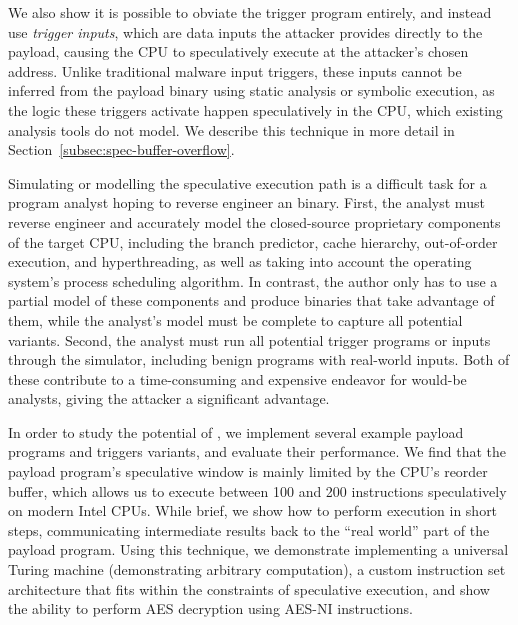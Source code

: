 
We also show it is possible to obviate the trigger program entirely, and
instead use \emph{trigger inputs}, which are data inputs the attacker provides
directly to
the payload, causing the CPU to speculatively execute
at the attacker's chosen address. Unlike traditional malware input triggers, these inputs
cannot be inferred from the payload binary using static analysis or symbolic
execution, as the logic these triggers activate happen speculatively in the
CPU, which existing analysis tools do not model. We describe this technique in
more detail in Section~\ref{subsec:spec-buffer-overflow}.

Simulating or modelling the speculative execution path is a difficult task for a
program analyst hoping to reverse engineer an \speculake binary. First, the
analyst must reverse engineer and accurately model the closed-source proprietary
components of the target CPU, including the branch predictor, cache hierarchy,
out-of-order execution, and hyperthreading, as well as taking into account the
operating system's process scheduling algorithm. In contrast, the \speculake
author only has to use a partial model of these components and produce binaries
that take advantage of them, while the analyst's model must be complete to
capture all potential \speculake variants. Second, the analyst must run all
potential trigger programs or inputs through the simulator, including benign
programs with real-world inputs. Both of these contribute to a time-consuming and expensive
endeavor for would-be analysts, giving the attacker a significant advantage.

In order to study the potential of \speculake, we implement several example
payload programs and triggers variants, and evaluate their performance. We find
that the payload program's speculative
window is mainly limited by the CPU's reorder buffer, which
allows us to execute between 100 and 200 instructions speculatively on modern
Intel CPUs. While brief, we show how to perform execution in short steps,
communicating intermediate results back to the ``real world'' part of the
payload program. Using this technique, we demonstrate implementing a universal
Turing machine (demonstrating arbitrary computation), a custom instruction set
architecture that fits within the constraints of speculative execution, and show
the ability to perform AES decryption using AES-NI instructions.

